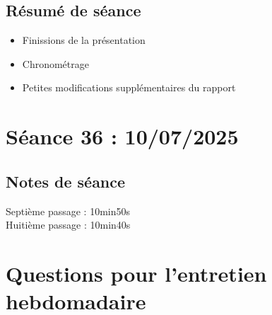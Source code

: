 \documentclass[12pt]{article}
\begin{document}
	\subsection{Résumé de séance}
	\begin{itemize}
		\item Finissions de la présentation
		\item Chronométrage
		\item Petites modifications supplémentaires du rapport
	\end{itemize}
	
	
	\section{Séance 36 : 10/07/2025}
	\subsection{Notes de séance}
	Septième passage : 10min50s\\
	Huitième passage : 10min40s\\
	
	
	
	\section{Questions pour l'entretien hebdomadaire}
\end{document}
